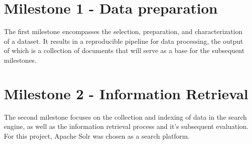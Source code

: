 \documentclass[sigconf]{acmart}
\begin{document}
\maketitle



\section{Milestone 1 - Data preparation}

The first milestone encompasses the selection, preparation, and characterization of a dataset. It results in a reproducible pipeline for data processing, the output of which is a collection of documents that will serve as a base for the subsequent milestones.








\section{Milestone 2 - Information Retrieval}

The second milestone focuses on the collection and indexing of data in the search engine, as well as the information retrieval process and it's subsequent evaluation. For this project, Apache Solr \cite{Solr} was chosen as a search platform. 











\newpage






\end{document}
